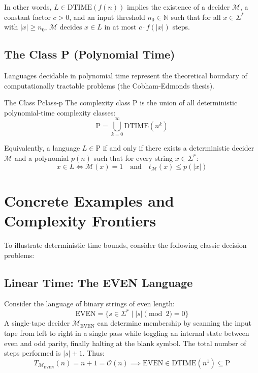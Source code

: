 In other words, $L \in \text{DTIME}(f(n))$ implies the existence of a decider $\mathcal{M}$, a constant factor $c > 0$, and an input threshold $n_0 \in \mathbb{N}$ such that for all $x \in \Sigma^*$ with $|x| \ge n_0$, $\mathcal{M}$ decides $x \in L$ in at most $c \cdot f(|x|)$ steps.

\subsection{The Class P (Polynomial Time)}
Languages decidable in polynomial time represent the theoretical boundary of computationally tractable problems (the Cobham-Edmonds thesis).

\begin{definition}{The Class P}{class-p}
The complexity class $\text{P}$ is the union of all deterministic polynomial-time complexity classes:
\[
\text{P} = \bigcup_{k=0}^{\infty} \text{DTIME}(n^k)
\]
\end{definition}

Equivalently, a language $L \in \text{P}$ if and only if there exists a deterministic decider $\mathcal{M}$ and a polynomial $p(n)$ such that for every string $x \in \Sigma^*$:
\[
x \in L \iff \mathcal{M}(x) = 1 \quad \text{and} \quad t_{\mathcal{M}}(x) \le p(|x|)
\]

\section{Concrete Examples and Complexity Frontiers}

To illustrate deterministic time bounds, consider the following classic decision problems:

\subsection{Linear Time: The EVEN Language}
Consider the language of binary strings of even length:
\[
\text{EVEN} = \{ s \in \Sigma^* \mid |s| \pmod 2 = 0 \}
\]
A single-tape decider $\mathcal{M}_{\text{EVEN}}$ can determine membership by scanning the input tape from left to right in a single pass while toggling an internal state between even and odd parity, finally halting at the blank symbol. The total number of steps performed is $|s| + 1$. Thus:
\[
T_{\mathcal{M}_{\text{EVEN}}}(n) = n + 1 = \mathcal{O}(n) \implies \text{EVEN} \in \text{DTIME}(n^1) \subseteq \text{P}
\]

